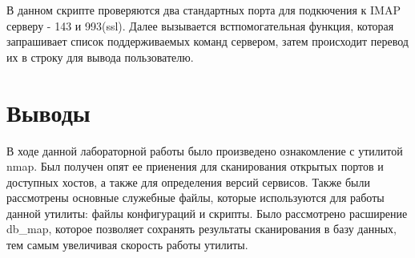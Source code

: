 \documentclass[10pt,a4paper]{report}
\begin{document}
		В данном скрипте проверяются два стандартных порта для подкючения к IMAP серверу - 143 и 993(ssl). Далее вызывается встпомогательная функция, которая запрашивает список поддерживаемых команд сервером, затем происходит перевод их в строку для вывода пользователю.
		
		\section{Выводы}
			В ходе данной лабораторной работы было произведено ознакомление с утилитой nmap. Был получен опят ее приенения для сканирования открытых портов и доступных хостов, а также для определения версий сервисов. Также были рассмотрены основные служебные файлы, которые используются для работы данной утилиты: файлы конфигураций и скрипты. Было рассмотрено расширение db\_map, которое позволяет сохранять результаты сканирования в базу данных, тем самым увеличивая скорость работы утилиты.
\end{document}
